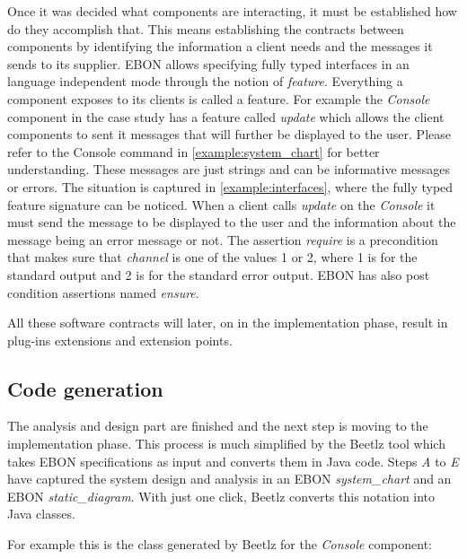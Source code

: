 \documentclass[conference]{IEEEtran}
\begin{document}



Once it was decided what components are interacting, it must be
established how do they accomplish that. This means establishing the
contracts between components by identifying the information a client
needs and the messages it sends to its supplier. EBON allows
specifying fully typed interfaces in an language independent mode
through the notion of \emph{feature}. Everything a component exposes
to its clients is called a feature. For example the \emph{Console}
component in the case study has a feature called \emph{update}
which allows the client components to sent it messages that will
further be displayed to the user. Please refer to the Console command
in \autoref{example:system_chart} for better understanding. These
messages are just strings and can be informative messages or errors.
The situation is captured
in \autoref{example:interfaces}, where the fully typed feature
signature can be noticed. When a client calls \emph{update} on the
\emph{Console} it must send the message to be displayed to the user
and the information about the message being an error message or not.
The assertion \emph{require} is a precondition that makes sure that
\emph{channel} is one of the values 1 or 2, where 1 is for the
standard output and 2 is for the standard error output. EBON has also
post condition assertions named \emph{ensure}.

All these software contracts will later, on in the implementation phase,
result in plug-ins extensions and extension points.


%
\subsection{Code generation}
\label{sec:code-generation}

The analysis and design part are finished and the next step is moving
to the implementation phase. This process is much simplified by the
Beetlz tool which takes EBON specifications as input and converts them
in Java code. Steps \emph{A} to \emph{E} have captured the system
design and analysis in an EBON \emph{system\_chart} and an EBON
\emph{static\_diagram}. With just one click, Beetlz converts this
notation into Java classes.

For example this is the class generated by Beetlz for the
\emph{Console} component:
\end{document}
